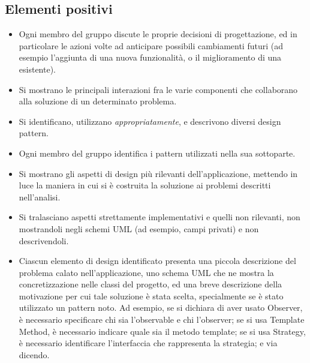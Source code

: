\documentclass[a4paper,12pt]{report}
\begin{document}
\subsection*{Elementi positivi}

\begin{itemize}
	\item Ogni membro del gruppo discute le proprie decisioni di progettazione, ed in particolare le azioni volte ad anticipare possibili cambiamenti futuri (ad esempio l'aggiunta di una nuova funzionalità, o il miglioramento di una esistente).
	\item Si mostrano le principali interazioni fra le varie componenti che collaborano alla soluzione di un determinato problema.
	\item Si identificano, utilizzano \textit{appropriatamente}, e descrivono diversi design pattern.
	\item Ogni membro del gruppo identifica i pattern utilizzati nella sua sottoparte.
	\item Si mostrano gli aspetti di design più rilevanti dell'applicazione, mettendo in luce la maniera in cui si è costruita la soluzione ai problemi descritti nell'analisi.
	\item Si tralasciano aspetti strettamente implementativi e quelli non rilevanti, non mostrandoli negli schemi UML (ad esempio, campi privati) e non descrivendoli.
	\item Ciascun elemento di design identificato presenta una piccola descrizione del problema calato
	      nell'applicazione, uno schema UML che ne mostra la concretizzazione nelle classi del progetto, ed
	      una breve descrizione della motivazione per cui tale soluzione è stata scelta, specialmente se è stato utilizzato un pattern noto. Ad esempio, se si
	      dichiara di aver usato Observer, è necessario specificare chi sia l'observable e chi l'observer; se
	      si usa Template Method, è necessario indicare quale sia il metodo template; se si usa Strategy, è
	      necessario identificare l'interfaccia che rappresenta la strategia; e via dicendo.
\end{itemize}
\end{document}
